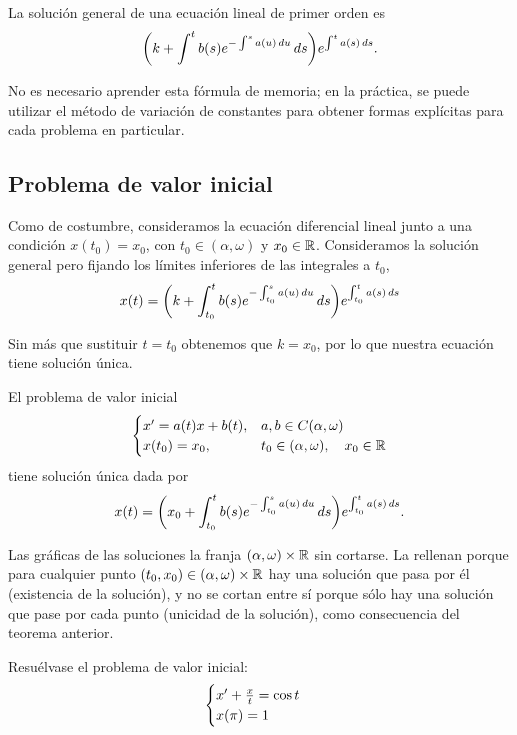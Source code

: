 \documentclass[../ecuaciones_diferenciales.tex]{subfiles}
\begin{document}
\begin{corollary}
	La solución general de una ecuación lineal de primer orden es
	\[\parens{k + \int^t b(s) e^{-\int^s a(u) \dif u} \dif s}
		e^{\int^t a(s) \dif s}.\]
\end{corollary}

No es necesario aprender esta fórmula de memoria; en la práctica, se puede
utilizar el método de variación de constantes para obtener formas explícitas
para cada problema en particular.

\subsection{Problema de valor inicial}

Como de costumbre, consideramos la ecuación diferencial lineal junto a una
condición \(x(t_0) = x_0\), con \(t_0 \in (\alpha, \omega)\) y \(x_0 \in \mathbb{R}\).
Consideramos la solución general pero fijando los límites inferiores de las
integrales a \(t_0\),
\[x(t) = \parens{k + \int_{t_0}^t b(s) e^{-\int_{t_0}^s a(u) \dif u} \dif s}
	e^{\int_{t_0}^t a(s) \dif s}\]

Sin más que sustituir \(t = t_0\) obtenemos que \(k = x_0\), por lo que
nuestra ecuación tiene solución única.

\begin{theorem}
	El problema de valor inicial
	\[\begin{cases}
			x' = a(t)x + b(t), & a, b \in C(\alpha, \omega) \\
			x(t_0) = x_0, 	  & t_0 \in (\alpha, \omega), \quad x_0 \in \mathbb{R}\end{cases}\]
	tiene solución única dada por
	\[x(t) =
		\parens{x_0 + \int_{t_0}^t b(s) e^{-\int_{t_0}^s a(u) \dif u} \dif s}
		e^{\int_{t_0}^t a(s) \dif s}.\]
\end{theorem}

Las gráficas de las soluciones  la franja
\((\alpha, \omega) \times \mathbb{R}\) sin cortarse. La rellenan porque para cualquier
punto \((t_0, x_0) \in (\alpha, \omega) \times \mathbb{R}\) hay una solución que pasa
por él (existencia de la solución), y no se cortan entre sí porque sólo hay una
solución que pase por cada punto (unicidad de la solución), como consecuencia
del teorema anterior.

\begin{example}
	Resuélvase el problema de valor inicial:
	\[\begin{cases}
			x' + \frac{x}{t} = \cos t \\
			x(\pi) = 1\end{cases}\]
\end{example}
\end{document}
